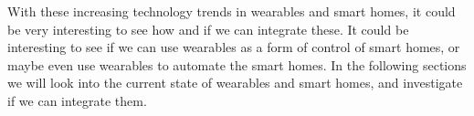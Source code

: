 With these increasing technology trends in wearables and smart homes, 
it could be very interesting to see how and if we can integrate these. 
It could be interesting to see if we can use wearables as a form of control of smart homes, 
or maybe even use wearables to automate the smart homes.
In the following sections we will look into the current state of wearables and smart homes, 
and investigate if we can integrate them. 
